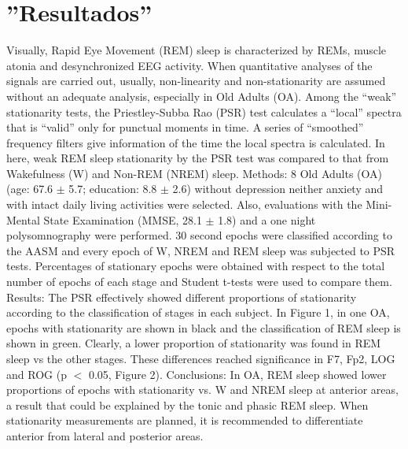 \chapter{''Resultados''}

Visually, Rapid Eye Movement (REM) sleep is characterized by REMs, muscle atonia and 
desynchronized EEG activity. When quantitative analyses of the signals are carried out, usually, 
non-linearity and non-stationarity are assumed without an adequate analysis, especially in 
Old Adults (OA). Among the “weak” stationarity tests, the Priestley-Subba Rao (PSR) test 
calculates a “local” spectra that is “valid” only for punctual moments in time. A series of 
“smoothed” frequency filters give information of the time the local spectra is calculated. 
In here, weak REM sleep stationarity by the PSR test was compared to that from Wakefulness (W) 
and Non-REM (NREM) sleep. Methods:  8 Old Adults (OA) 
(age: 67.6 $\pm$ 5.7; education: 8.8 $\pm$ 2.6) 
without depression neither anxiety and with intact daily living activities were selected. Also, 
evaluations with the Mini-Mental State Examination (MMSE, 28.1 $\pm$ 1.8) and a one night 
polysomnography were performed. 30 second epochs were classified according to the AASM and every 
epoch of W, NREM and REM sleep was subjected to PSR tests. Percentages of stationary epochs were 
obtained with respect to the total number of epochs of each stage and Student t-tests were used 
to compare them. Results: The PSR effectively showed different proportions of stationarity 
according to the classification of stages in each subject. In Figure 1, in one OA, epochs with 
stationarity are shown in black and the classification of REM sleep is shown in green. Clearly, 
a lower proportion of stationarity was found in REM sleep vs the other stages. These differences 
reached significance in F7, Fp2, LOG and ROG (p $<$ 0.05, Figure 2). Conclusions: In OA, REM sleep 
showed lower proportions of epochs with stationarity vs. W and NREM sleep at anterior areas, a 
result that could be explained by the tonic and phasic REM sleep. When stationarity measurements 
are planned, it is recommended to differentiate anterior from lateral and posterior areas.


